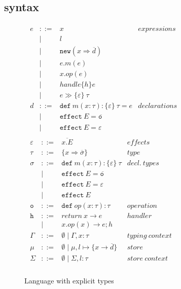 \documentclass{article}
\newcommand{\keywadj}[1]{\mathtt{#1}}
\newcommand{\keyw}[1]{\keywadj{#1}~}
\begin{document}
\subsection{syntax}
\begin{figure}[H]
\small{
\[
\begin{array}{lll}
\begin{array}{lllr}
e & ::= & x  & \mathit{expressions}\\
& | & l \\
& | & \keywadj{new}(x \Rightarrow \overline{d})  \\
& | & e.m(e)  \\
& | & x.op(e)  \\
& | & handle \{ h \} e   \\
& | & e \gg \{\varepsilon\}\ \tau\\
d & ::= & \keyw{def} m(x : \tau) :  \{\varepsilon\} ~\tau = e &
\mathit{declarations}\\
& |   & \keyw{effect} E = \overline{\keyw{o}} \\
& |   & \keyw{effect} E = \varepsilon \\



\end{array}
\begin{array}{lllr}


\varepsilon & ::= & \overline{x.E} & \mathit{effects}\\
\tau & ::= & \{ x \Rightarrow \overline{\sigma} \} & \mathit{type}\\
\sigma & ::= & \keyw{def} m(x : \tau) : \{\varepsilon\} ~\tau & \mathit{decl.~types}\\
       & |   & \keyw{effect} E = \overline{\keyw{o}}\\
       & |   & \keyw{effect} E = \varepsilon\\
       & |   & \keyw{effect} E \\
\keyw{o} & ::= & \keyw{def} op(x:\tau):  \tau & \mathit{operation}\\
\keyw{h} & ::= & return\ x \rightarrow e & \mathit{handler}\\
& | & x.op(x) \rightarrow e; h \\
\Gamma & ::= & \emptyset \mid \Gamma, x:\tau & \mathit{typing\ context}\\
\mu & ::= & \emptyset \mid \mu, l \mapsto \{x \rightarrow \overline{d}\} & \mathit{store}\\
\Sigma & ::= & \emptyset \mid \Sigma, l : \tau & \mathit{store\ context}\\
\
\end{array}
\end{array}
\]
}
\caption{Language with explicit types}
\end{figure}
\end{document}

